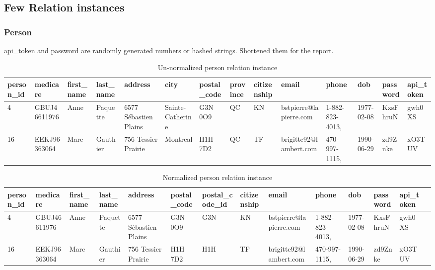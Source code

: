 \documentclass{article}
\begin{document}
\subsection{Few Relation instances}
\subsubsection{Person}
api\_token and password are randomly generated numbers or hashed strings. Shortened them for the report.
\begin{table}[H]
\centering
\begin{adjustbox}{width=1.2\textwidth,center=\textwidth}
\begin{tabular}{|l|l|l|l|l|l|l|l|l|l|l|l|l|l|} 
        \hline
        person\_id & medicare & first\_name & last\_name & address & city & postal\_code & province & citizenship & email & phone & dob & password & api\_token \\
        \hline 
4 & GBUJ46611976 & Anne & Paquette & 6577 Sébastien Plains & Sainte-Catherine & G3N 0O9 & QC & KN & bstpierre@lapierre.com & 1-882-823-4013, & 1977-02-08 & KxsFhruN & gwh0XS \\    
16 & EEKJ96363064 & Marc & Gauthier & 756 Tessier Prairie & Montreal & H1H 7D2 & QC & TF & brigitte92@lambert.com & 470-997-1115, & 1990-06-29 & zd9Znke & xO3TUV\\        
        \hline
\end{tabular}
\end{adjustbox}
\caption{Un-normalized person relation instance}
\end{table}
\begin{table}[H]
\centering
\begin{adjustbox}{width=1.2\textwidth,center=\textwidth}
\begin{tabular}{|l|l|l|l|l|l|l|l|l|l|l|l|l|l|} 
        \hline
        person\_id & medicare & first\_name & last\_name & address & postal\_code & postal\_code\_id & citizenship & email & phone & dob & password & api\_token \\
        \hline 
4 & GBUJ46611976 & Anne & Paquette & 6577 Sébastien Plains & G3N 0O9 & G3N & KN & bstpierre@lapierre.com & 1-882-823-4013, & 1977-02-08 & KxsFhruN & gwh0XS \\    
16 & EEKJ96363064 & Marc & Gauthier & 756 Tessier Prairie & H1H 7D2 & H1H & TF & brigitte92@lambert.com & 470-997-1115, & 1990-06-29 & zd9Znke & xO3TUV\\        
        \hline
\end{tabular}
\end{adjustbox}
\caption{Normalized person relation instance}
\end{table}
\end{document}
